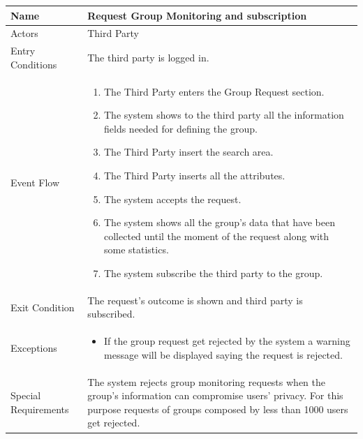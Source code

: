 \begin{enumerate}
\FloatBarrier
\begin{table}[h]
\begin{tabular}{|l|p{}|}
\hline
Name             & Request Group Monitoring and subscription \\ \hline
Actors           & Third Party  \\ \hline
Entry Conditions & The third party is logged in.    \\ \hline
Event Flow       & \begin{enumerate}
            \item The Third Party enters the Group Request section.
            \item The system shows to the third party all the information fields needed for defining the group.
            \item The Third Party insert the search area.
            \item The Third Party inserts all the attributes.
            \item The system accepts the request.
            \item The system shows all the group's data that have been collected until the moment of the request along with some statistics. 
            \item The system subscribe the third party to the group.
        \end{enumerate}\\ \hline
Exit Condition   & The request's outcome is shown and third party is subscribed.\\ \hline
Exceptions       & \begin{itemize}
\item If the group request get rejected by the system a warning message will be displayed saying the request is rejected.
\end{itemize}\\ \hline
Special Requirements & The system rejects group monitoring requests when the group's information can compromise users' privacy. For this purpose requests of groups composed by less than 1000 users get rejected.
\\ \hline
\end{tabular}
\end{table}
\FloatBarrier
\clearpage



\end{enumerate}

